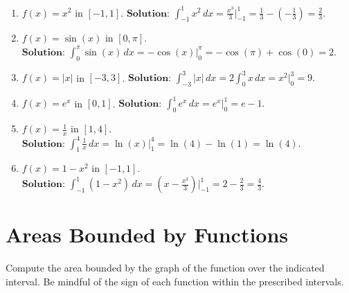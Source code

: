\documentclass{article}
\begin{document}
\begin{enumerate}[leftmargin=0.5cm, label=(\alph*), rightmargin=0.2cm]

    \item $f(x) = x^2$ in $[-1, 1]$. \quad 
    \(
    \textbf{Solution: } \int_{-1}^{1} x^2 \, dx = \frac{x^3}{3}\Big|_{-1}^{1} = \frac{1}{3} - \left(-\frac{1}{3}\right) = \frac{2}{3}.
    \)

    \item $f(x) = \sin(x)$ in $[0, \pi]$. \quad 
    \(
    \textbf{Solution: } \int_{0}^{\pi} \sin(x) \, dx = -\cos(x)\Big|_{0}^{\pi} = -\cos(\pi) + \cos(0) = 2.
    \)

    \item $f(x) = |x|$ in $[-3, 3]$. \quad 
    \(
    \textbf{Solution: } \int_{-3}^{3} |x| \, dx = 2 \int_{0}^{3} x \, dx = x^2\Big|_0^3 = 9.
    \)

    \item $f(x) = e^x$ in $[0, 1]$. \quad 
    \(
    \textbf{Solution: } \int_{0}^{1} e^x \, dx = e^x\Big|_0^1 = e - 1.
    \)

    \item $f(x) = \frac{1}{x}$ in $[1, 4]$. \quad 
    \(
    \textbf{Solution: } \int_{1}^{4} \frac{1}{x} \, dx = \ln(x)\Big|_{1}^{4} = \ln(4) - \ln(1) = \ln(4).
    \)

    \item $f(x) = 1 - x^2$ in $[-1, 1]$. \quad 
    \(
    \textbf{Solution: } \int_{-1}^{1} (1 - x^2) \, dx = \left(x - \frac{x^3}{3}\right)\Big|_{-1}^{1} = 2 - \frac{2}{3} = \frac{4}{3}.
    \)

\end{enumerate}

\section*{Areas Bounded by Functions}

Compute the area bounded by the graph of the function over the indicated interval. Be mindful of the sign of each function within the prescribed intervals.
\end{document}
